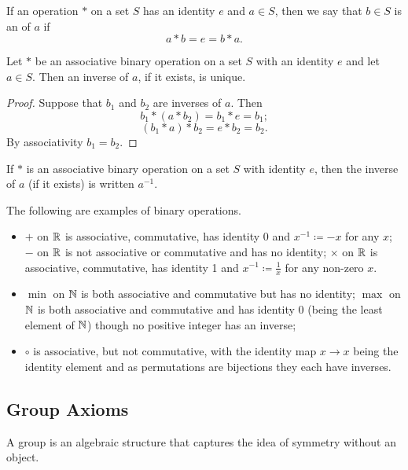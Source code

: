 If an operation $\ast$ on a set $S$ has an identity $e$ and $a \in S$, then we say that $b \in S$ is an  of $a$ if
\[ a \ast b = e = b \ast a. \]

\begin{proposition}
Let $\ast$ be an associative binary operation on a set $S$ with an identity $e$ and let $a \in S$. Then an inverse of $a$, if it exists, is unique.
\end{proposition}
\begin{proof}
Suppose that $b_1$ and $b_2$ are inverses of $a$. Then
\[ b_1 \ast (a \ast b_2) = b_1 \ast e = b_1; \]
\[ (b_1 \ast a) \ast b_2 = e \ast b_2 = b_2. \]
By associativity $b_1 = b_2$.
\end{proof}

\begin{notation}
If $\ast$ is an associative binary operation on a set $S$ with identity $e$, then the inverse of $a$ (if it exists) is written $a^{-1}$.
\end{notation}

\begin{example}
The following are examples of binary operations.
\begin{itemize}
\item $+$ on $\mathbb R$ is associative, commutative, has identity 0 and $x^{-1} \coloneqq -x$ for any $x$; $-$ on $\mathbb R$ is not associative or commutative and has no identity; $\times$ on $\mathbb R$ is associative, commutative, has identity 1 and $x^{-1} \coloneqq \frac{1}{x}$ for any non-zero $x$.
\item $\min$ on $\mathbb N$ is both associative and commutative but has no identity; $\max$ on $\mathbb N$ is both associative and commutative and has identity $0$ (being the least element of $\mathbb N$) though no positive integer has an inverse;
\item $\circ$ is associative, but not commutative, with the identity map $x \to x$ being the identity element and as permutations are bijections they each have inverses.
\end{itemize}
\end{example}
\pagebreak

\subsection{Group Axioms}
A group is an algebraic structure that captures the idea of symmetry without an object.


